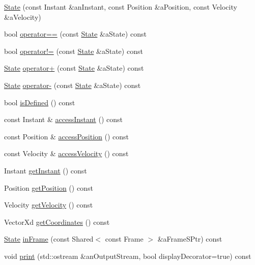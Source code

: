 \begin{DoxyCompactItemize}
\item 
\hyperlink{classostk_1_1astro_1_1trajectory_1_1_state_a8628aceae903c9492f0fb269888434b0}{State} (const Instant \&an\+Instant, const Position \&a\+Position, const Velocity \&a\+Velocity)
\item 
bool \hyperlink{classostk_1_1astro_1_1trajectory_1_1_state_acd68798b63a7e3a89e61b4b668d8dbb0}{operator==} (const \hyperlink{classostk_1_1astro_1_1trajectory_1_1_state}{State} \&a\+State) const
\item 
bool \hyperlink{classostk_1_1astro_1_1trajectory_1_1_state_a53ac2b13092bc7777efa14362fec4c46}{operator!=} (const \hyperlink{classostk_1_1astro_1_1trajectory_1_1_state}{State} \&a\+State) const
\item 
\hyperlink{classostk_1_1astro_1_1trajectory_1_1_state}{State} \hyperlink{classostk_1_1astro_1_1trajectory_1_1_state_a8d8ff34816c5e4895f9274fc06dbb799}{operator+} (const \hyperlink{classostk_1_1astro_1_1trajectory_1_1_state}{State} \&a\+State) const
\item 
\hyperlink{classostk_1_1astro_1_1trajectory_1_1_state}{State} \hyperlink{classostk_1_1astro_1_1trajectory_1_1_state_abd0979467d66ca07b86d5405255d26ed}{operator-\/} (const \hyperlink{classostk_1_1astro_1_1trajectory_1_1_state}{State} \&a\+State) const
\item 
bool \hyperlink{classostk_1_1astro_1_1trajectory_1_1_state_a09966efb00e3206cc2d20935c55658ad}{is\+Defined} () const
\item 
const Instant \& \hyperlink{classostk_1_1astro_1_1trajectory_1_1_state_afc21870411eef52ce1293e31eda16d3c}{access\+Instant} () const
\item 
const Position \& \hyperlink{classostk_1_1astro_1_1trajectory_1_1_state_a711322a78c02f981d11ebec2ca0a0cd4}{access\+Position} () const
\item 
const Velocity \& \hyperlink{classostk_1_1astro_1_1trajectory_1_1_state_a7f6d626b9d5f045e026cd1ff2ea33200}{access\+Velocity} () const
\item 
Instant \hyperlink{classostk_1_1astro_1_1trajectory_1_1_state_af1ba3040b895b0963d5fb96a0756cc2b}{get\+Instant} () const
\item 
Position \hyperlink{classostk_1_1astro_1_1trajectory_1_1_state_ad5ceac322a929f0f62214a663a21f4ae}{get\+Position} () const
\item 
Velocity \hyperlink{classostk_1_1astro_1_1trajectory_1_1_state_a1a992dcad42fb3094766907a9472e7e0}{get\+Velocity} () const
\item 
Vector\+Xd \hyperlink{classostk_1_1astro_1_1trajectory_1_1_state_adece3f2dda107d9178b40648dfbc01d0}{get\+Coordinates} () const
\item 
\hyperlink{classostk_1_1astro_1_1trajectory_1_1_state}{State} \hyperlink{classostk_1_1astro_1_1trajectory_1_1_state_aa9c95303df830f9dfed347231961dcf6}{in\+Frame} (const Shared$<$ const Frame $>$ \&a\+Frame\+S\+Ptr) const
\item 
void \hyperlink{classostk_1_1astro_1_1trajectory_1_1_state_a0072b543bbac1abe5e94609c74491b5d}{print} (std\+::ostream \&an\+Output\+Stream, bool display\+Decorator=true) const
\end{DoxyCompactItemize}
